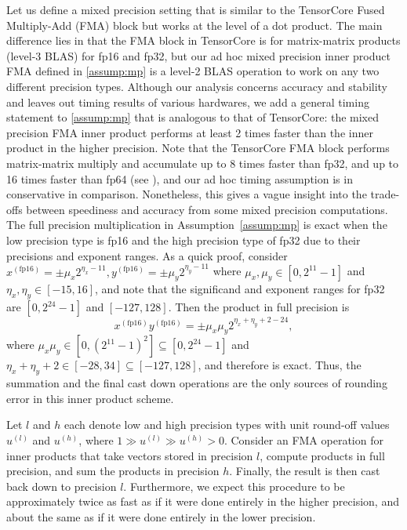 Let us define a mixed precision setting that is similar to the TensorCore Fused Multiply-Add (FMA) block but works at the level of a dot product. 
The main difference lies in that the FMA block in TensorCore is for matrix-matrix products (level-3 BLAS) for fp16 and fp32, but our ad hoc mixed precision inner product FMA defined in \cref{assump:mp} is a level-2 BLAS operation to work on any two different precision types.
Although our analysis concerns accuracy and stability and leaves out timing results of various hardwares, we add a general timing statement to \cref{assump:mp} that is analogous to that of TensorCore: the mixed precision FMA inner product performs at least 2 times faster than the inner product in the higher precision.
Note that the TensorCore FMA block performs matrix-matrix multiply and accumulate up to 8 times faster than fp32, and up to 16 times faster than fp64 (see ), and our ad hoc timing assumption is in conservative in comparison. 
Nonetheless, this gives a vague insight into the trade-offs between speediness and accuracy from some mixed precision computations.  
The full precision multiplication in Assumption~\ref{assump:mp} is exact when the low precision type is fp16 and the high precision type of fp32 due to their precisions and exponent ranges. 
As a quick proof, consider $x^{(\text{fp16})} = \pm\mu_x2^{\eta_x -11},y^{(\text{fp16})} = \pm\mu_y2^{\eta_y -11}$ where $\mu_x,\mu_y\in[0,2^{11}-1]$ and $\eta_x,\eta_y\in[-15,16]$, and note that the significand and exponent ranges for fp32 are $[0, 2^{24}-1]$ and $[-127,128]$.
Then the product in full precision is
\[x^{(\text{fp16})}y^{(\text{fp16})} = \pm\mu_x\mu_y 2^{\eta_x+\eta_y+2-24},\]
where  $\mu_x\mu_y \in[0,(2^{11}-1)^2] \subseteq [0,2^{24}-1]$ and $\eta_x+\eta_y +2\in[-28,34]\subseteq[-127,128]$, and therefore is exact.
Thus, the summation and the final cast down operations are the only sources of rounding error in this inner product scheme.
\begin{assump}
	\label{assump:mp}
	Let $l$ and $h$ each denote low and high precision types with unit round-off values $u^{(l)}$ and $u^{(h)}$, where $1 \gg u^{(l)} \gg u^{(h)} >0$.
	Consider an FMA operation for inner products that take vectors stored in precision $l$, compute products in full precision, and sum the products in precision $h$. 
	Finally, the result is then cast back down to precision $l$.
	Furthermore, we expect this procedure to be approximately twice as fast as if it were done entirely in the higher precision, and about the same as if it were done entirely in the lower precision. 
\end{assump}
